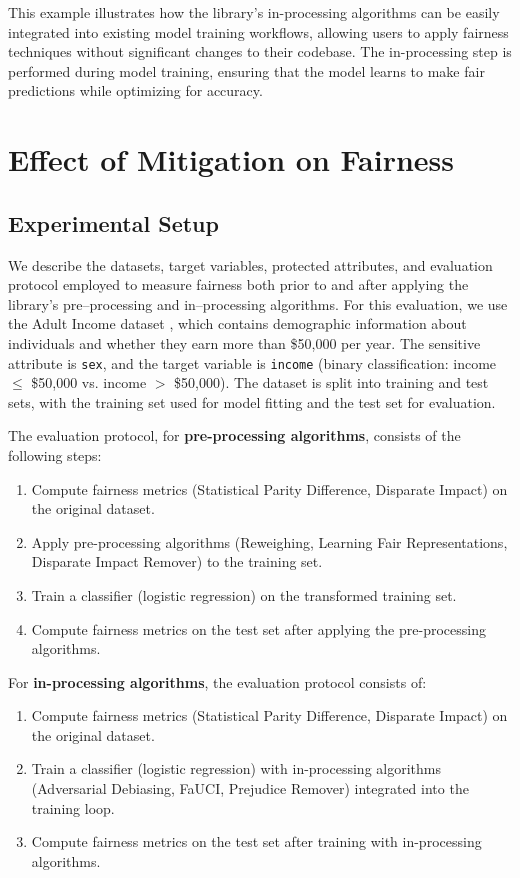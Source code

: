 \documentclass[12pt,a4paper,openright,twoside]{book}
\begin{document}
This example illustrates how the library's in-processing algorithms can be easily integrated into existing model training workflows, allowing users to apply fairness techniques without significant changes to their codebase. The in-processing step is performed during model training, ensuring that the model learns to make fair predictions while optimizing for accuracy.

\section{Effect of Mitigation on Fairness}
\subsection{Experimental Setup}
We describe the datasets, target variables, protected attributes, and evaluation protocol employed to measure fairness both prior to and after applying the library's pre--processing and in--processing algorithms. For this evaluation, we use the Adult Income dataset \cite{adultDataset}, which contains demographic information about individuals and whether they earn more than \$50,000 per year. The sensitive attribute is \texttt{sex}, and the target variable is \texttt{income} (binary classification: income $\leq$ \$50,000 vs. income $>$ \$50,000). The dataset is split into training and test sets, with the training set used for model fitting and the test set for evaluation.

The evaluation protocol, for \textbf{pre-processing algorithms}, consists of the following steps:
\begin{enumerate}
    \item Compute fairness metrics (Statistical Parity Difference, Disparate Impact) on the original dataset.
    \item Apply pre-processing algorithms (Reweighing, Learning Fair Representations, Disparate Impact Remover) to the training set.
    \item Train a classifier (logistic regression) on the transformed training set.
    \item Compute fairness metrics on the test set after applying the pre-processing algorithms.
\end{enumerate}

For \textbf{in-processing algorithms}, the evaluation protocol consists of:
\begin{enumerate}
    \item Compute fairness metrics (Statistical Parity Difference, Disparate Impact) on the original dataset.
    \item Train a classifier (logistic regression) with in-processing algorithms (Adversarial Debiasing, FaUCI, Prejudice Remover) integrated into the training loop.
    \item Compute fairness metrics on the test set after training with in-processing algorithms.
\end{enumerate}
\end{document}

